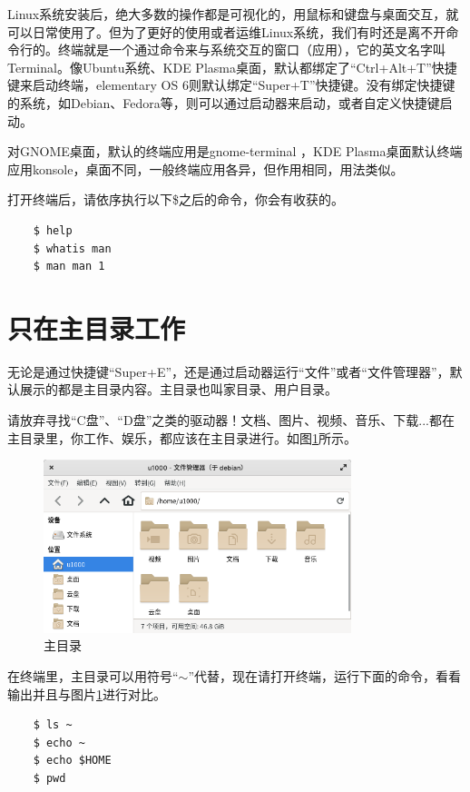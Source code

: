 \par Linux系统安装后，绝大多数的操作都是可视化的，用鼠标和键盘与桌面交互，就可以日常使用了。但为了更好的使用或者运维Linux系统，我们有时还是离不开命令行的。终端就是一个通过命令来与系统交互的窗口（应用），它的英文名字叫Terminal。像Ubuntu系统、KDE Plasma桌面，默认都绑定了“Ctrl+Alt+T”快捷键来启动终端，elementary OS 6则默认绑定“Super+T”快捷键。没有绑定快捷键的系统，如Debian、Fedora等，则可以通过启动器来启动，或者自定义快捷键启动。
\par 对GNOME桌面，默认的终端应用是gnome-terminal ，KDE Plasma桌面默认终端应用konsole，桌面不同，一般终端应用各异，但作用相同，用法类似。
\par 打开终端后，请依序执行以下\$之后的命令，你会有收获的。
\begin{lstlisting}
    $ help
    $ whatis man
    $ man man 1
\end{lstlisting}


\section{只在主目录工作}

\par 无论是通过快捷键“Super+E”，还是通过启动器运行“文件”或者“文件管理器”，默认展示的都是主目录内容。主目录也叫家目录、用户目录。
\par 请放弃寻找“C盘”、“D盘”之类的驱动器！文档、图片、视频、音乐、下载...都在主目录里，你工作、娱乐，都应该在主目录进行。如图\ref{fig:2021-10-28_22-31-38}所示。

\begin{figure} [htbp]
	\centering
	\includegraphics [width=0.8\textwidth]{images/ch01/2021-10-28_22-31-38.png}
	\caption{主目录}
	\label{fig:2021-10-28_22-31-38}
\end{figure}

\par 在终端里，主目录可以用符号“$\sim$”代替，现在请打开终端，运行下面的命令，看看输出并且与图片\ref{fig:2021-10-28_22-31-38}进行对比。
\begin{lstlisting}
    $ ls ~
    $ echo ~
    $ echo $HOME
    $ pwd
\end{lstlisting}


